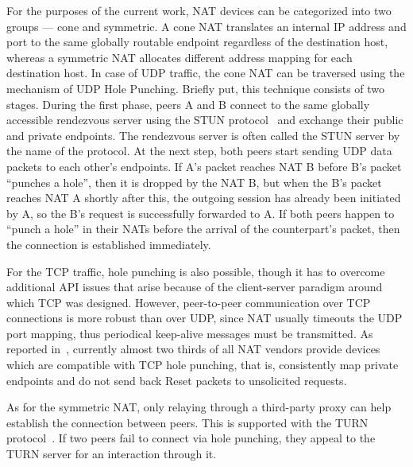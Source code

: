 For the purposes of the current work, NAT devices can be categorized into two groups --- cone and symmetric. A cone NAT translates an internal IP address and port to the same globally routable endpoint regardless of the destination host, whereas a symmetric NAT allocates different address mapping for each destination host. In case of UDP traffic, the cone NAT can be traversed using the mechanism of UDP Hole Punching. Briefly put, this technique consists of two stages. During the first phase, peers A and B connect to the same globally accessible rendezvous server using the STUN protocol~\cite{STUN}  and exchange their public and private endpoints. The rendezvous server is often called the STUN server by the name of the protocol. At the next step, both peers start sending UDP data packets to each other's endpoints. If A's packet reaches NAT B before B's packet ``punches a hole'', then it is dropped by the NAT B, but when the B's packet reaches NAT A shortly after this, the outgoing session has already been initiated by A, so the B's request is successfully forwarded to A. If both peers happen to ``punch a hole'' in their NATs before the arrival of the counterpart's packet, then the connection is established immediately.

For the TCP traffic, hole punching is also possible, though it has to overcome additional API issues that arise because of the client-server paradigm around which TCP was designed. However, peer-to-peer communication over TCP connections is more robust than over UDP, since NAT usually timeouts the UDP port mapping, thus periodical keep-alive messages must be transmitted. As reported in~\cite{hole_punching}, currently almost two thirds of all NAT vendors provide devices which are compatible with TCP hole punching, that is, consistently map private endpoints and do not send back Reset packets to unsolicited requests.

As for the symmetric NAT, only relaying through a third-party proxy can help establish the connection between peers. This is supported with the TURN protocol~\cite{TURN}. If two peers fail to connect via hole punching, they appeal to the TURN server for an interaction through it.



